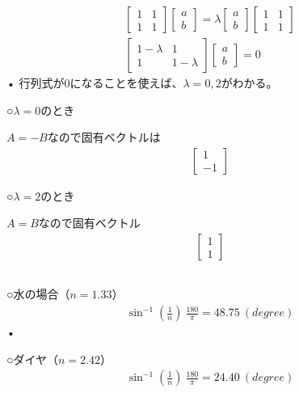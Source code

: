 \documentclass{jsarticle}
\begin{document}
\begin{align}
\begin{bmatrix}
1&1 \\
1&1
\end{bmatrix}
\begin{bmatrix}
a  \\
b
\end{bmatrix}
=
\lambda
\begin{bmatrix}
a  \\
b
\end{bmatrix} 
\begin{bmatrix}
1&1 \\
1&1
\end{bmatrix} \\
\begin{bmatrix}
1-\lambda&1 \\
1&1-\lambda
\end{bmatrix}
\begin{bmatrix}
a  \\
b
\end{bmatrix} 
=0
\end{align}•
行列式が0になることを使えば、$\lambda=0,2$がわかる。


○$\lambda = 0$のとき


$A=-B$なので固有ベクトルは
\begin{align}
\begin{bmatrix}
1  \\
-1
\end{bmatrix} 
\end{align}


○$ \lambda = 2 $のとき


$A = B$なので固有ベクトル
\begin{align}
\begin{bmatrix}
1  \\
1
\end{bmatrix} 
\end{align}


\subsection{}
○水の場合（$n=1.33$）
\begin{align}
\sin^{-1}(\frac{1}{n}) \  \frac{180}{\pi} = 48.75 \ (degree)
\end{align}•

○ダイヤ（$n= 2.42$）
\begin{align}
\sin^{-1}(\frac{1}{n})  \ \frac{180}{\pi} = 24.40 \ (degree)
\end{align}
\end{document}
